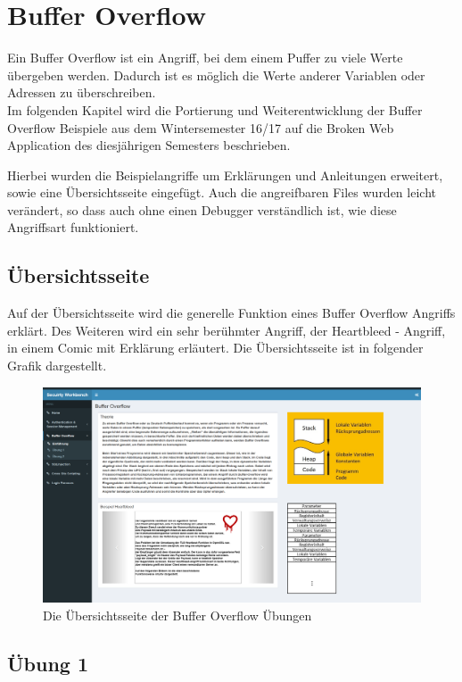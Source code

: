 \chapter{Buffer Overflow}
Ein Buffer Overflow ist ein Angriff, bei dem einem Puffer zu viele Werte übergeben werden. Dadurch ist es möglich die Werte anderer Variablen oder Adressen zu überschreiben. \\
Im folgenden Kapitel wird die Portierung und Weiterentwicklung der Buffer Overflow Beispiele aus dem Wintersemester 16/17 auf die Broken Web Application des diesjährigen Semesters beschrieben.

Hierbei wurden die Beispielangriffe um Erklärungen und Anleitungen erweitert, sowie eine Übersichtsseite eingefügt. Auch die angreifbaren Files wurden leicht verändert, so dass auch ohne einen Debugger verständlich ist, wie diese Angriffsart funktioniert.
\section{Übersichtsseite}
Auf der Übersichtsseite wird die generelle Funktion eines Buffer Overflow Angriffs erklärt. Des Weiteren wird ein sehr berühmter Angriff, der Heartbleed - Angriff, in einem Comic mit Erklärung erläutert. Die Übersichtsseite ist in folgender Grafik dargestellt.

\begin{figure}[H]
	\centering
	\includegraphics[width=\textwidth]{images/Bufferoverflow/Uebersichtsseite.PNG}
	\caption{Die Übersichtsseite der Buffer Overflow Übungen}
	\label{fig:BO_Overview}
\end{figure}

\section{Übung 1}
